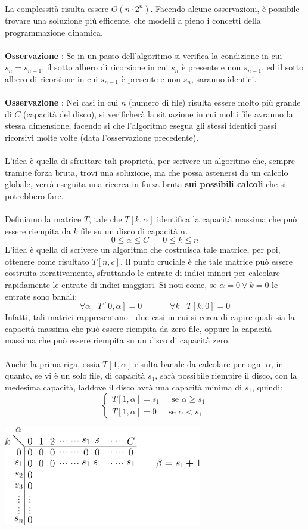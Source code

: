 \documentclass[12pt, letterpaper]{article}
\newcommand{\acc}{\\\hphantom{}\\}
\begin{document}
La complessità risulta essere $O(n\cdot 2^n)$. Facendo alcune osservazioni, è possibile trovare una soluzione più
efficente, che modelli a pieno i concetti della programmazione dinamica.\acc
\textbf{Osservazione }: Se in un passo dell'algoritmo si verifica la condizione in cui $s_n=s_{n-1}$, il sotto albero di
ricorsione in cui $s_n$ è presente e non $s_{n-1}$, ed il sotto albero di
ricorsione in cui $s_{n-1}$ è presente e non $s_{n}$, saranno identici.\acc
\textbf{Osservazione} : Nei casi in cui $n$ (numero di file) risulta essere molto più grande di $C$ (capacità del disco),
si verificherà la situazione in cui molti file avranno la stessa dimensione, facendo si che l'algoritmo esegua gli stessi
identici passi ricorsivi molte volte (data l'osservazione precedente).\acc
L'idea è quella di sfruttare tali proprietà, per scrivere un algoritmo che, sempre tramite forza bruta, trovi una soluzione,
ma che possa astenersi da un calcolo globale, verrà eseguita una ricerca in forza bruta \textbf{sui possibili calcoli} che
si potrebbero fare.\acc
Definiamo la matrice $T$, tale che $T[k,\alpha]$ identifica la capacità massima che può essere riempita da
$k$ file su un disco di capacità $\alpha$. $$0\le\alpha\le C \;\;\;\;\;\;0\le k\le n$$
L'idea è quella di scrivere un algoritmo che costruisca tale matrice, per poi, ottenere come risultato $T[n,c]$. Il punto cruciale è
che tale matrice può essere costruita iterativamente, sfruttando le entrate di indici minori per calcolare rapidamente le
entrate di indici maggiori. Si noti come, se $\alpha = 0 \lor k= 0 $ le entrate sono banali:
$$\forall \alpha \;\;\;T[0,\alpha ]= 0 \;\;\;\;\;\;\;\;\;\;\;\;\forall k \;\;\;T[k,0]=0$$
Infatti, tali matrici rappresentano i due casi in cui si cerca di capire quali sia la capacità massima che può essere
riempita da zero file, oppure la capacità massima che può essere riempita su un disco di capacità zero.\acc
Anche la prima riga, ossia $T[1,\alpha ]$ risulta banale da calcolare per ogni $\alpha$, in quanto, se vi è un solo
file, di capacità $s_1$, sarà possibile riempire il disco, con la medesima capacità, laddove il disco avrà una capacità
minima di $s_1$, quindi: $$\begin{cases}
        T[1,\alpha ] = s_1\;\;\;\;\text{ se }\alpha \ge s_1 \\
        T[1,\alpha ] = 0\;\;\;\;\text{ se }\alpha < s_1
    \end{cases} $$  \begin{center}
    \includegraphics[width=0.65\textwidth ]{images/matriceSpazioFile.eps}
\end{center}
\end{document}
